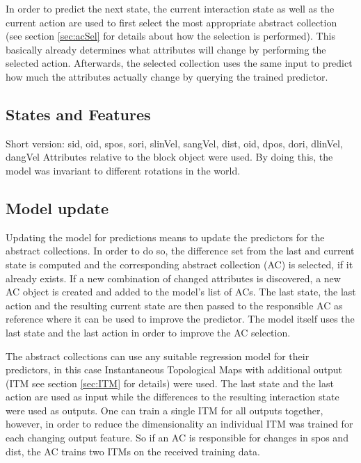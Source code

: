 In order to predict the next state, the current interaction state as well as the current action are used to first select the most appropriate abstract collection (see section \ref{sec:acSel} for details about how the selection is performed). This basically already determines what attributes will change by performing the selected action. Afterwards, the selected collection uses the same input to predict how much the attributes actually change by querying the trained predictor.

\subsection{States and Features\label{sec:pairStates}}

Short version:
sid, oid, spos, sori, slinVel, sangVel, dist, oid, dpos, dori, dlinVel, dangVel
Attributes relative to the block object were used. By doing this, the model 
was 
invariant to different rotations in the world.

\subsection{Model update\label{sec:pairUpdate}}
Updating the model for predictions means to update the predictors for the abstract collections. In 
order to do so, the difference set from the last and current state is computed and the 
corresponding abstract collection (AC) is selected, if it already exists. If a new combination of 
changed attributes is discovered, a new AC object is created and added to the model's list of ACs. 
The last state, the last action and the resulting current state are then passed to the responsible AC
as reference where it can be used to improve the predictor. The model itself uses the last state and the last action in order to improve the AC selection.

The abstract collections can use any suitable regression model for their predictors, in this case Instantaneous Topological Maps with additional output (ITM see section \ref{sec:ITM} for details) were used. The last state and the last action are used as input while the differences to the resulting interaction state were used as outputs. One can train a single ITM for all outputs together, however, in order to reduce the dimensionality an individual ITM was trained for each changing output feature. So if an AC is responsible for changes in spos and dist, the AC trains two ITMs on the received training data.

